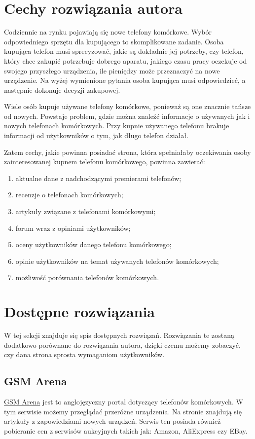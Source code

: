 \section{Cechy rozwiązania autora}\label{ideal_solution}
Codziennie na rynku pojawiają się nowe telefony komórkowe. Wybór odpowiedniego sprzętu dla kupującego to skomplikowane zadanie. Osoba kupująca telefon musi sprecyzować, jakie są dokładnie jej potrzeby, czy telefon, który chce zakupić potrzebuje dobrego aparatu, jakiego czasu pracy oczekuje od swojego przyszłego urządzenia, ile pieniędzy może przeznaczyć na nowe urządzenie. Na wyżej wymienione pytania osoba kupująca musi odpowiedzieć, a następnie dokonuje decyzji zakupowej.

Wiele osób kupuje używane telefony komórkowe, ponieważ są one znacznie tańsze od nowych. Powstaje problem, gdzie można znaleźć informacje o używanych jak i nowych telefonach komórkowych. Przy kupnie używanego telefonu brakuje informacji od użytkowników o tym, jak długo telefon działał.  

Zatem cechy, jakie powinna posiadać strona, która spełniałaby oczekiwania osoby zainteresowanej kupnem telefonu komórkowego, powinna zawierać:
\begin{enumerate}
    \item aktualne dane z nadchodzącymi premierami telefonów;
    \item recenzje o telefonach komórkowych;
    \item artykuły związane z telefonami komórkowymi;
    \item forum wraz z opiniami użytkowników;
    \item oceny użytkowników danego telefonu komórkowego;
    \item opinie użytkowników na temat używanych telefonów komórkowych;
    \item możliwość porównania telefonów komórkowych.
\end{enumerate}

\section{Dostępne rozwiązania}
W tej sekcji znajduje się spis dostępnych rozwiązań. Rozwiązania te zostaną dodatkowo porównane do rozwiązania autora, dzięki czemu możemy zobaczyć, czy dana strona sprosta wymaganiom użytkowników.

\subsection{GSM Arena}
\href{https://www.gsmarena.com/}{GSM Arena} \cite{gsm_arena} jest to anglojęzyczny portal dotyczący telefonów komórkowych. W tym serwisie możemy przeglądać przeróżne urządzenia. Na stronie znajdują się artykuły z zapowiedziami nowych urządzeń. Serwis ten posiada również pobieranie cen z serwisów aukcyjnych takich jak: Amazon, AliExpress czy EBay.

